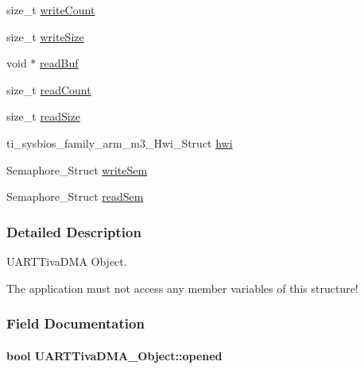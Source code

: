\begin{DoxyCompactItemize}
\item 
size\-\_\-t \hyperlink{struct_u_a_r_t_tiva_d_m_a___object_a34199d43e13d70dfcd8b640cd772a4bc}{write\-Count}
\item 
size\-\_\-t \hyperlink{struct_u_a_r_t_tiva_d_m_a___object_ab75f4cfd55f7c15c80f1dc03638fd575}{write\-Size}
\item 
void $\ast$ \hyperlink{struct_u_a_r_t_tiva_d_m_a___object_a61fc144c2eaaed90683d30f1c6949f33}{read\-Buf}
\item 
size\-\_\-t \hyperlink{struct_u_a_r_t_tiva_d_m_a___object_a5c90720b132e067ab8a8acfa34409310}{read\-Count}
\item 
size\-\_\-t \hyperlink{struct_u_a_r_t_tiva_d_m_a___object_ad223d07a1814962421a0968e787449cc}{read\-Size}
\item 
ti\-\_\-sysbios\-\_\-family\-\_\-arm\-\_\-m3\-\_\-\-Hwi\-\_\-\-Struct \hyperlink{struct_u_a_r_t_tiva_d_m_a___object_a6d53ea962b0b237a2d53937665733798}{hwi}
\item 
Semaphore\-\_\-\-Struct \hyperlink{struct_u_a_r_t_tiva_d_m_a___object_aa594694853d811a1e06cc553f90acb2c}{write\-Sem}
\item 
Semaphore\-\_\-\-Struct \hyperlink{struct_u_a_r_t_tiva_d_m_a___object_a8d92851a2c895c372a500654d7a483a9}{read\-Sem}
\end{DoxyCompactItemize}


\subsubsection{Detailed Description}
U\-A\-R\-T\-Tiva\-D\-M\-A Object. 

The application must not access any member variables of this structure! 

\subsubsection{Field Documentation}
\paragraph[{opened}]{\setlength{\rightskip}{0pt plus 5cm}bool U\-A\-R\-T\-Tiva\-D\-M\-A\-\_\-\-Object\-::opened}\label{struct_u_a_r_t_tiva_d_m_a___object_a01c01877d64d61e31bb34441cb6acd09}

